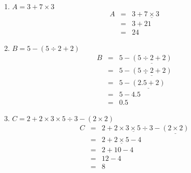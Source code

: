 \documentclass[11pt]{article}
\begin{document}
\begin{enumerate}
\item $A = 3 + 7 \times 3 $\\
  \begin{eqnarray*}
    A & = & 3 + \underline{7 \times 3}\\
    & = & 3 + 21\\
    & = & 24
  \end{eqnarray*}

\item $B = 5 - (5 \div 2  + 2)$\\
  \begin{eqnarray*}
    B & = & 5 - \underline{(5 \div 2  + 2)}\\
    & = & 5 - \underline{(\underline{5 \div 2}  + 2)}\\
    & = & 5 - \underline{(2.5  + 2)}\\
    & = & 5 - 4.5\\
    & = & 0.5 
  \end{eqnarray*}

\item $C = 2 + 2 \times 3 \times 5 \div 3 - (2 \times 2)$\\
  \begin{eqnarray*}
    C & = & 2 + \underline{2 \times 3 \times 5 \div 3} - \underline{(2 \times 2)}\\
    & = & 2 + \underline{2 \times 5} - 4\\
    & = & 2 + 10 - 4 \\
    & = & 12 - 4\\
    & = & 8               
  \end{eqnarray*}
\end{enumerate}
\end{document}
